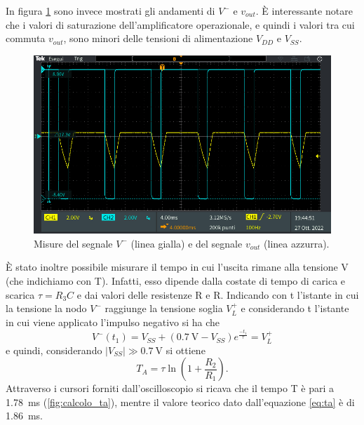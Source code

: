\noindent
In figura \ref{fig:segnale_uscita} sono invece mostrati gli andamenti di $V^{-}$ e $v_{out}$. È interessante notare che i valori di saturazione dell'amplificatore operazionale, e quindi i valori tra cui commuta $v_{out}$, sono minori delle tensioni di alimentazione $V_{DD}$ e $V_{SS}$.
\begin{figure}[h]
	\centering
	\includegraphics[width=\linewidth]{./ImageFiles/Laboratorio 4/TEK00008.PNG}
	\caption{Misure del segnale $V^{-}$ (linea gialla) e del segnale $v_{out}$ (linea azzurra).}
	\label{fig:segnale_uscita}
\end{figure}

\noindent
\`E stato inoltre possibile misurare il tempo in cui l'uscita rimane alla tensione V (che indichiamo con T). Infatti, esso dipende dalla costate di tempo di carica e scarica $\tau=R_3C$ e dai valori delle resistenze R e R. Indicando con t l'istante in cui la tensione la nodo $V^-$ raggiunge la tensione soglia $V_L^+$ e considerando t l'istante in cui viene applicato l'impulso negativo si ha che
\begin{equation}
	V^-(t_1)=V_{SS}+(\SI{0.7}{\volt}-V_{SS})e^{\frac{-t_1}{\tau}}=V_L^+
\end{equation}
e quindi, considerando $|V_{SS}|\gg\SI{0.7}{\volt}$ si ottiene
\begin{equation}
	T_A=\tau\ln\left(1+\frac{R_2}{R_1}\right).
	\label{eq:ta}
\end{equation}
Attraverso i cursori forniti dall'oscilloscopio si ricava che il tempo T è pari a \SI{1.78}{\milli\second} (\Fig\ref{fig:calcolo_ta}), mentre il valore teorico dato dall'equazione \ref{eq:ta} è di \SI{1.86}{\milli\second}.


